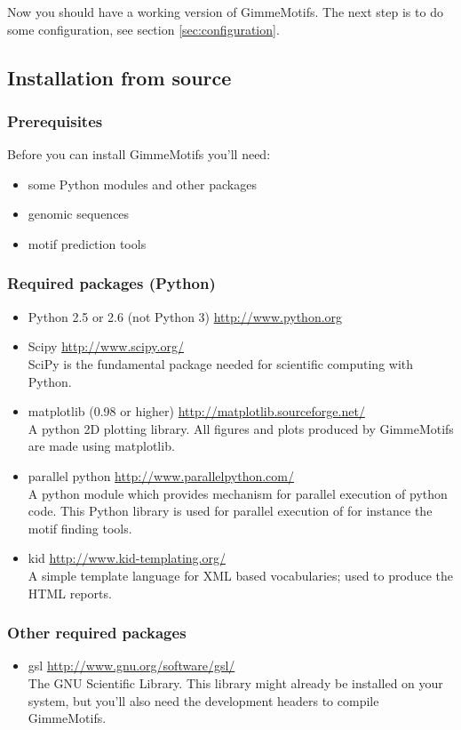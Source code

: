 \documentclass[10pt]{article}
\begin{document}
Now you should have a working version of GimmeMotifs. The next step is to do some configuration, see section \ref{sec:configuration}.

\subsection{Installation from source}

\subsubsection{Prerequisites}
Before you can install GimmeMotifs you'll need: 
\begin{itemize}
 \item some Python modules and other packages
 \item genomic sequences 
 \item motif prediction tools
\end{itemize}

\subsubsection{Required packages (Python)}
\begin{itemize}
\item Python 2.5 or 2.6 (not Python 3) \url{http://www.python.org}
\item Scipy \url{http://www.scipy.org/} \\
SciPy is the fundamental package needed for scientific computing with Python. 
\item matplotlib (0.98 or higher) \url{http://matplotlib.sourceforge.net/} \\
A python 2D plotting library. All figures and plots produced by GimmeMotifs are made using matplotlib.
\item parallel python \url{http://www.parallelpython.com/} \\
A python module which provides mechanism for parallel execution of python code. This Python library is used for parallel execution of for instance the motif finding tools. 
\item kid \url{http://www.kid-templating.org/} \\
A simple template language for XML based vocabularies; used to produce the HTML reports.
\end{itemize}

\subsubsection{Other required packages}
\begin{itemize}
 \item gsl \url{http://www.gnu.org/software/gsl/} \\
The GNU Scientific Library. 
This library might already be installed on your system, but you'll also need the development headers to compile GimmeMotifs. 
\end{itemize}
\end{document}
